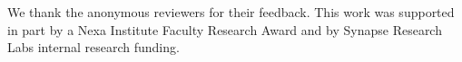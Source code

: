 \begin{acks}
We thank the anonymous reviewers for their feedback. This work was supported in part by a
Nexa Institute Faculty Research Award and by Synapse Research Labs internal research
funding.
\end{acks}
